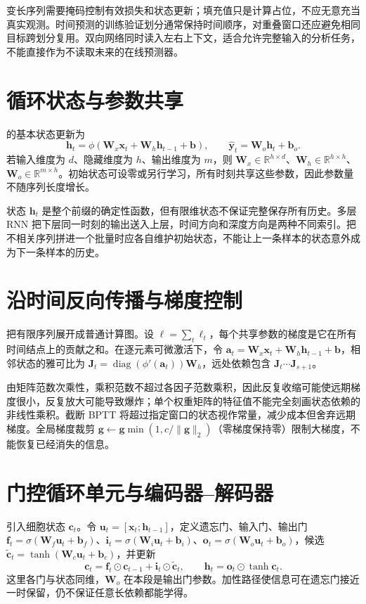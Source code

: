 \documentclass[UTF8,12pt,a4paper,fontset=fandol]{ctexbook}
\begin{document}
变长序列需要掩码控制有效损失和状态更新；填充值只是计算占位，不应无意充当真实观测。时间预测的训练验证划分通常保持时间顺序，对重叠窗口还应避免相同目标跨划分复用。双向网络同时读入左右上下文，适合允许完整输入的分析任务，不能直接作为不读取未来的在线预测器。

\section{循环状态与参数共享}
的基本状态更新为
\begin{equation}
\mathbf h_t=\phi(\mathbf W_x\mathbf x_t+\mathbf W_h\mathbf h_{t-1}+\mathbf b),
\qquad \widehat{\mathbf y}_t=\mathbf W_o\mathbf h_t+\mathbf b_o.
\label{eq:dl-rnn-state}
\end{equation}
若输入维度为 $d$、隐藏维度为 $h$、输出维度为 $m$，则 $\mathbf W_x\in\mathbb R^{h\times d}$、$\mathbf W_h\in\mathbb R^{h\times h}$、$\mathbf W_o\in\mathbb R^{m\times h}$。初始状态可设零或另行学习，所有时刻共享这些参数，因此参数量不随序列长度增长。

状态 $\mathbf h_t$ 是整个前缀的确定性函数，但有限维状态不保证完整保存所有历史。多层 RNN 把下层同一时刻的输出送入上层，时间方向和深度方向是两种不同索引。把不相关序列拼进一个批量时应各自维护初始状态，不能让上一条样本的状态意外成为下一条样本的历史。

\section{沿时间反向传播与梯度控制}
把有限序列展开成普通计算图。设 $\ell=\sum_t\ell_t$，每个共享参数的梯度是它在所有时间结点上的贡献之和。在逐元素可微激活下，令 $\mathbf a_t=\mathbf W_x\mathbf x_t+\mathbf W_h\mathbf h_{t-1}+\mathbf b$，相邻状态的雅可比为 $\mathbf J_t=\operatorname{diag}(\phi'(\mathbf a_t))\mathbf W_h$，远处依赖包含 $\mathbf J_t\cdots\mathbf J_{s+1}$。

由矩阵范数次乘性，乘积范数不超过各因子范数乘积，因此反复收缩可能使远期梯度很小，反复放大可能导致爆炸；单个权重矩阵的特征值不能完全刻画状态依赖的非线性乘积。截断 BPTT 将超过指定窗口的状态视作常量，减少成本但舍弃远期梯度。全局梯度裁剪 $\mathbf g\leftarrow\mathbf g\min(1,c/\|\mathbf g\|_2)$（零梯度保持零）限制大梯度，不能恢复已经消失的信息。

\section{门控循环单元与编码器--解码器}
引入细胞状态 $\mathbf c_t$。令 $\mathbf u_t=[\mathbf x_t;\mathbf h_{t-1}]$，定义遗忘门、输入门、输出门 $\mathbf f_t=\sigma(\mathbf W_f\mathbf u_t+\mathbf b_f)$、$\mathbf i_t=\sigma(\mathbf W_i\mathbf u_t+\mathbf b_i)$、$\mathbf o_t=\sigma(\mathbf W_o\mathbf u_t+\mathbf b_o)$，候选 $\widetilde{\mathbf c}_t=\tanh(\mathbf W_c\mathbf u_t+\mathbf b_c)$，并更新
\[
\mathbf c_t=\mathbf f_t\odot\mathbf c_{t-1}+\mathbf i_t\odot\widetilde{\mathbf c}_t,
\qquad \mathbf h_t=\mathbf o_t\odot\tanh\mathbf c_t.
\]
这里各门与状态同维，$\mathbf W_o$ 在本段是输出门参数。加性路径使信息可在遗忘门接近一时保留，仍不保证任意长依赖都能学得。
\end{document}
